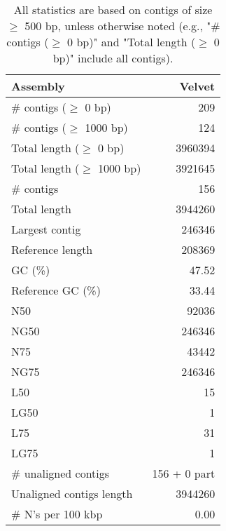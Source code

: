 \documentclass[12pt,a4paper]{article}
\begin{document}
\begin{table}[ht]
\begin{center}
\caption{All statistics are based on contigs of size $\geq$ 500 bp, unless otherwise noted (e.g., "\# contigs ($\geq$ 0 bp)" and "Total length ($\geq$ 0 bp)" include all contigs).}
\begin{tabular}{|l*{1}{|r}|}
\hline
Assembly & Velvet \\ \hline
\# contigs ($\geq$ 0 bp) & 209 \\ \hline
\# contigs ($\geq$ 1000 bp) & 124 \\ \hline
Total length ($\geq$ 0 bp) & 3960394 \\ \hline
Total length ($\geq$ 1000 bp) & 3921645 \\ \hline
\# contigs & 156 \\ \hline
Total length & 3944260 \\ \hline
Largest contig & 246346 \\ \hline
Reference length & 208369 \\ \hline
GC (\%) & 47.52 \\ \hline
Reference GC (\%) & 33.44 \\ \hline
N50 & 92036 \\ \hline
NG50 & 246346 \\ \hline
N75 & 43442 \\ \hline
NG75 & 246346 \\ \hline
L50 & 15 \\ \hline
LG50 & 1 \\ \hline
L75 & 31 \\ \hline
LG75 & 1 \\ \hline
\# unaligned contigs & 156 + 0 part \\ \hline
Unaligned contigs length & 3944260 \\ \hline
\# N's per 100 kbp & 0.00 \\ \hline
\end{tabular}
\end{center}
\end{table}
\end{document}
